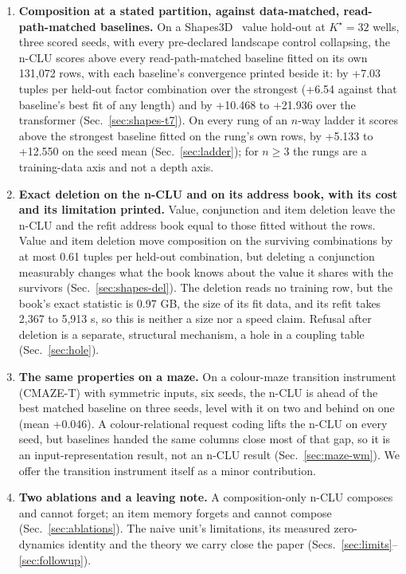 \documentclass{article} %
\newcommand{\Kstar}{\ensuremath{K^{\star}}}
\begin{document}
\begin{enumerate}[leftmargin=*,itemsep=2pt]
\item \textbf{Composition at a stated partition, against data-matched, read-path-matched baselines.} On a
  Shapes3D~\citep{burgess2018shapes,kim2018disentangling} value hold-out at $\Kstar=32$ wells, three scored seeds, with every %
  pre-declared landscape control collapsing, the n-CLU scores above every read-path-matched baseline
  fitted on its own 131,072 rows, with each baseline's convergence printed beside it: by +7.03 tuples %
  per held-out factor combination over the strongest (+6.54 against that baseline's best fit of any length) and by +10.468 %
  to +21.936 over the transformer (Sec.~\ref{sec:shapes-t7}). On every rung of an $n$-way ladder it %
  scores above the strongest baseline fitted on the rung's own rows, by +5.133 to +12.550 on the seed %
  mean (Sec.~\ref{sec:ladder}); for $n\ge3$ the rungs are a training-data axis and not a depth axis.
\item \textbf{Exact deletion on the n-CLU and on its address book, with its cost and its limitation
  printed.} Value, conjunction and item deletion leave the n-CLU and the refit address book equal to
  those fitted without the rows. Value and item deletion move composition on the surviving combinations by
  at most 0.61 tuples per held-out combination, but deleting a conjunction measurably changes what the book knows %
  about the value it shares with the survivors (Sec.~\ref{sec:shapes-del}). The deletion reads no
  training row, but the book's exact statistic is 0.97 GB, the size of its fit data, and its refit %
  takes 2,367 to 5,913 s, so this is neither a size nor a speed claim. Refusal after deletion is a %
  separate, structural mechanism, a hole in a coupling table (Sec.~\ref{sec:hole}).
\item \textbf{The same properties on a maze.} On a colour-maze transition instrument (CMAZE-T) with
  symmetric inputs, six seeds, the n-CLU is ahead of
  the best matched baseline on three seeds, level with it on two and behind on one (mean
  +0.046). A colour-relational request coding lifts the n-CLU on every seed, but baselines handed the %
  same columns close most of that gap, so it is an input-representation result, not an n-CLU result
  (Sec.~\ref{sec:maze-wm}). We offer the transition instrument itself as a minor contribution.
\item \textbf{Two ablations and a leaving note.} A composition-only n-CLU composes and cannot
  forget; an item memory forgets and cannot compose (Sec.~\ref{sec:ablations}). The naive unit's
  limitations, its measured zero-dynamics identity and the theory we carry close the paper
  (Secs.~\ref{sec:limits}--\ref{sec:followup}).
\end{enumerate}
\end{document}
